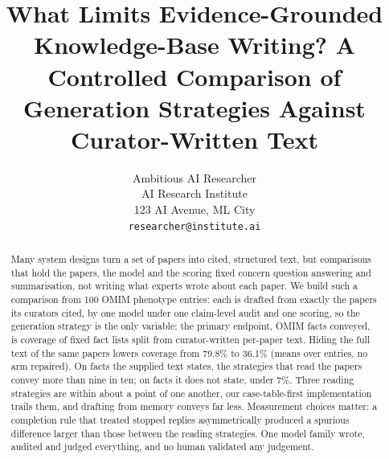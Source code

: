 \documentclass{article} %
\title{What Limits Evidence-Grounded Knowledge-Base Writing? A Controlled Comparison of Generation Strategies Against Curator-Written Text}
\author{Ambitious AI Researcher\\
AI Research Institute\\
123 AI Avenue, ML City\\
\texttt{researcher@institute.ai}
}
\begin{document}
\maketitle


\begin{abstract}
Many system designs turn a set of papers into cited, structured text, but comparisons that hold the papers, the model and the scoring fixed concern question answering and summarisation, not writing what experts wrote about each paper. We build such a comparison from 100 OMIM phenotype entries: each is drafted from exactly the papers its curators cited, by one model under one claim-level audit and one scoring, so the generation strategy is the only variable; the primary endpoint, OMIM facts conveyed, is coverage of fixed fact lists split from curator-written per-paper text. Hiding the full text of the same papers lowers coverage from 79.8\% to 36.1\% (means over entries, no arm repaired). On facts the supplied text states, the strategies that read the papers convey more than nine in ten; on facts it does not state, under 7\%. Three reading strategies are within about a point of one another, our case-table-first implementation trails them, and drafting from memory conveys far less. Measurement choices matter: a completion rule that treated stopped replies asymmetrically produced a spurious difference larger than those between the reading strategies. One model family wrote, audited and judged everything, and no human validated any judgement.
\end{abstract}
\end{document}
